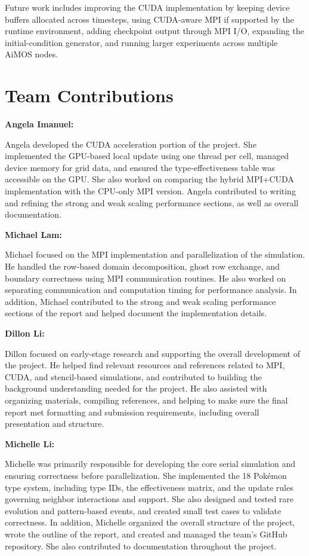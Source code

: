 \documentclass[10pt,twocolumn]{article}
\begin{document}
Future work includes improving the CUDA implementation by keeping device buffers allocated across timesteps, using CUDA-aware MPI if supported by the runtime environment, adding checkpoint output through MPI I/O, expanding the initial-condition generator, and running larger experiments across multiple AiMOS nodes.

\FloatBarrier
\section*{Team Contributions}


\textbf{Angela Imanuel:}

Angela developed the CUDA acceleration portion of the project. She implemented the GPU-based local update using one thread per cell, managed device memory for grid data, and ensured the type-effectiveness table was accessible on the GPU. She also worked on comparing the hybrid MPI+CUDA implementation with the CPU-only MPI version. Angela contributed to writing and refining the strong and weak scaling performance sections, as well as overall documentation.

\textbf{Michael Lam:}

Michael focused on the MPI implementation and parallelization of the simulation. He handled the row-based domain decomposition, ghost row exchange, and boundary correctness using MPI communication routines. He also worked on separating communication and computation timing for performance analysis. In addition, Michael contributed to the strong and weak scaling performance sections of the report and helped document the implementation details.

\textbf{Dillon Li:}

Dillon focused on early-stage research and supporting the overall development of the project. He helped find relevant resources and references related to MPI, CUDA, and stencil-based simulations, and contributed to building the background understanding needed for the project. He also assisted with organizing materials, compiling references, and helping to make sure the final report met formatting and submission requirements, including overall presentation and structure.

\textbf{Michelle Li:}

Michelle was primarily responsible for developing the core serial simulation and ensuring correctness before parallelization. She implemented the 18 Pokémon type system, including type IDs, the effectiveness matrix, and the update rules governing neighbor interactions and support. She also designed and tested rare evolution and pattern-based events, and created small test cases to validate correctness. In addition, Michelle organized the overall structure of the project, wrote the outline of the report, and created and managed the team’s GitHub repository. She also contributed to documentation throughout the project.
\end{document}
